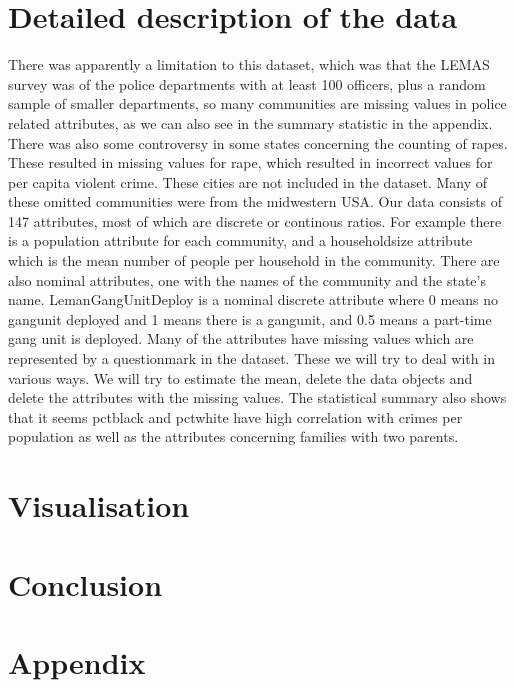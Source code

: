 \documentclass[a4paper,10pt]{article}
\begin{document}
\section{Detailed description of the data} 
There was apparently a limitation to this dataset, which was that the LEMAS survey was of the police departments with at least 100 officers, plus a random sample of smaller departments, so many communities are missing values in police related attributes, as we can also see in the summary statistic in the appendix. There was also some controversy in some states concerning the counting of rapes. These resulted in missing values for rape, which resulted in incorrect values for per capita violent crime. These cities are not included in the dataset. Many of these omitted communities were from the midwestern USA. Our data consists of 147 attributes, most of which are discrete or continous ratios. For example there is a population attribute for each community, and a householdsize attribute which is the mean number of people per household in the community. There are also nominal attributes, one with the names of the community and the state's name. LemanGangUnitDeploy is a nominal discrete attribute where 0 means no gangunit deployed and 1 means there is a gangunit, and 0.5 means a part-time gang unit is deployed. 
Many of the attributes have missing values which are represented by a questionmark in the dataset. These we will try to deal with in various ways. We will try to estimate the mean, delete the data objects and delete the attributes with the missing values.
The statistical summary also shows that it seems pctblack and pctwhite have high correlation with crimes per population as well as the attributes concerning families with two parents.

\section{Visualisation}

\section{Conclusion}

\section{Appendix}
\end{document}
